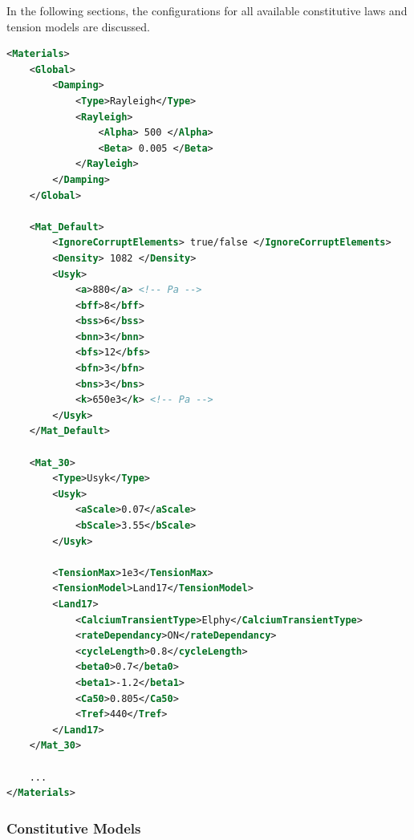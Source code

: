 In the following sections, the configurations for all available constitutive laws and tension models are discussed.

\begin{lstlisting}[language=XML,caption=.xml settings for material definitions]
<Materials>
    <Global>
        <Damping>
            <Type>Rayleigh</Type>
            <Rayleigh>
                <Alpha> 500 </Alpha>
                <Beta> 0.005 </Beta>
            </Rayleigh>
        </Damping>
    </Global>

    <Mat_Default>
        <IgnoreCorruptElements> true/false </IgnoreCorruptElements>
        <Density> 1082 </Density>
        <Usyk>
            <a>880</a> <!-- Pa -->
            <bff>8</bff>
            <bss>6</bss>
            <bnn>3</bnn>
            <bfs>12</bfs>
            <bfn>3</bfn>
            <bns>3</bns>
            <k>650e3</k> <!-- Pa -->
        </Usyk>
    </Mat_Default>
    
    <Mat_30> 
        <Type>Usyk</Type>
        <Usyk>
            <aScale>0.07</aScale>
            <bScale>3.55</bScale>
        </Usyk>

        <TensionMax>1e3</TensionMax>
        <TensionModel>Land17</TensionModel>
        <Land17>
            <CalciumTransientType>Elphy</CalciumTransientType>
            <rateDependancy>ON</rateDependancy>
            <cycleLength>0.8</cycleLength>
            <beta0>0.7</beta0>
            <beta1>-1.2</beta1>
            <Ca50>0.805</Ca50>
            <Tref>440</Tref>
        </Land17>
    </Mat_30>
    
    ...
</Materials>
\end{lstlisting}

\subsubsection{Constitutive Models}

